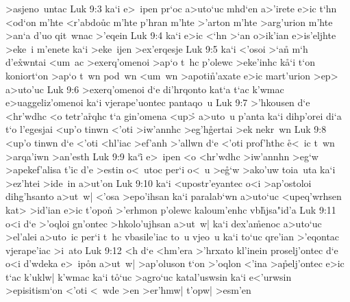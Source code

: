 >asjeno~untac\bibvsend
\vs Luk 9:3
ka`i
e>~ipen
pr`oc
a>uto`uc
mhd`en
a>'irete
e>ic
t`hn
<od`on
m'hte
<r'abdo\r{u}c
m'hte
p'hran
m'hte
>'arton
m'hte
>arg'urion
m'hte
>an`a
d'uo
qit~wnac
>'eqein\bibvsend
\vs Luk 9:4
ka`i
e>ic
<`hn
>`an
o>ik'ian
e>is'eljhte
>eke~i
m'enete
ka`i
>eke~ijen
>ex'erqesje\bibvsend
\vs Luk 9:5
ka`i
<'osoi
>`a\r{n}
m`h
d'e\r{x}wntai
<um~ac
>exerq'omenoi
>ap`o
t~hc
p'olewc
>eke'inhc
k\r{a}`i
t`on
koniort`on
>ap`o
t~wn
pod~wn
<um~wn
>apoti\r{n}'axate
e>ic
mart'urion
>ep>
a>uto'uc\bibvsend
\vs Luk 9:6
>exerq'omenoi
d`e
di'hrqonto
kat`a
t`ac
k'wmac
e>uaggeliz'omenoi
ka`i
vjerape'uontec
pantaqo~u\bibvsend
\vs Luk 9:7
>'hkousen
d`e
<hr'wdhc
<o
tetr'a\r{r}qhc
t`a
gin'omena
<up>\r{}
a>uto~u
p'anta
ka`i
dihp'orei
di`a
t`o
l'egesjai
<up'o
tinwn
<'oti
>iw'annhc
>eg'h\r{g}ertai
>ek
nekr~wn\bibvsend
\vs Luk 9:8
<up'o
tinwn
d`e
<'oti
<hl'iac
>ef'anh
>'allwn
d`e
<'oti
prof'hthc
\r{e}<~ic
t~wn
>arqa'iwn
>an'esth\bibvsend
\vs Luk 9:9
ka`i\r{}
e>~ipen
<o
<hr'wdhc
>iw'annhn
>eg`w
>apekef'alisa
t'ic
d'e
>estin
o<~utoc
per`i
o<~u
>e\r{g}`w
>ako'uw
toia~uta
ka`i
>ez'htei
>ide~in
a>ut'on\bibvsend
\vs Luk 9:10
ka`i
<upostr'eyantec
o<i
>ap'ostoloi
dihg'hsanto
a>ut~w|
<'osa
>epo'ihsan
ka`i
paralab`wn
a>uto`uc
<upeq'wrhsen
kat>
>id'ian
e>ic
t'opon\r{}
>'erhmon
p'olewc
kaloum'enhc
vb\r{h}jsa"id'a\bibvsend
{}
\vs Luk 9:11
o<i
d`e
>'oqloi
gn'ontec
>hkolo'ujhsan
a>ut~w|
ka`i
dex'a\r{m}enoc
a>uto`uc
>el'alei
a>uto~ic
per`i
t~hc
vbasile'iac
to~u
vjeo~u
ka`i
to`uc
qre'ian
>'eqontac
vjerape'iac
>i~ato\bibvsend
\vs Luk 9:12
<h
d`e
<hm'era
>'hrxato
kl'inein
proselj'ontec
d`e
o<i
d'wdeka
e>~ip\r{o}n
a>ut~w|
>ap'oluson
t`on
>'oqlon
<'ina
>a\r{p}elj'ontec
e>ic
t`ac
k'uklw|
k'wmac
ka`i
t\r{o}`uc
>agro`uc
katal'uswsin
ka`i
e<'urwsin
>episitism`on
<'oti
<~wde
>en
>er'hmw|
t'opw|
>esm'en\bibvsend
